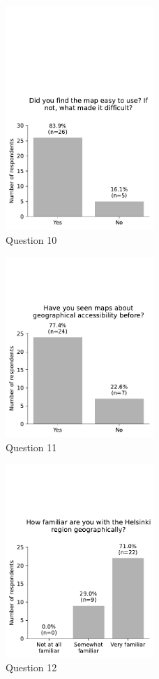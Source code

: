 \begin{figure}[H]
	\centering
	\includegraphics[width=0.5\textwidth]{visual/figures/survey/9.pdf}
	\caption{Question 10}
	\label{fig:q 10}
\end{figure}

\begin{figure}[H]
	\centering
	\includegraphics[width=0.5\textwidth]{visual/figures/survey/10.pdf}
	\caption{Question 11}
	\label{fig:q 11}
\end{figure}

\begin{figure}[H]
	\centering
	\includegraphics[width=0.5\textwidth]{visual/figures/survey/11.pdf}
	\caption{Question 12}
	\label{fig:q 12}
\end{figure}

